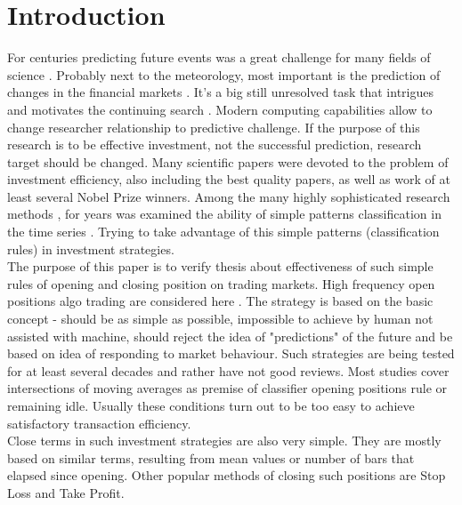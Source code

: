 \documentclass{tewiart}
\begin{document}
\section{Introduction}
\indent For centuries predicting future events was a great challenge for many fields of science \cite{ball07, wu12}. Probably next to the meteorology, most important is the prediction of changes in the financial markets \cite{krutsinger99, satchwell05, schwager02}. It's a big still unresolved task that intrigues and motivates the continuing search \cite{fama91, fama98}. Modern computing capabilities allow to change researcher relationship to predictive challenge. If the purpose of this research is to be effective investment, not the successful prediction, research target should be changed. Many scientific papers were devoted to the problem of investment efficiency, also including the best quality papers, as well as work of at least several Nobel Prize winners. Among the many highly sophisticated research methods \cite{fujimoto03, kompa08, pawlak02, pedrycz97, rua09, raghuraj09, wilinski09}, for years was examined the ability of simple patterns classification in the time series \cite{brock92, cai05, gencay99, lebaron99, satchwell05}. Trying to take advantage of this simple patterns (classification rules) in investment strategies.\\
\indent The purpose of this paper is to verify thesis about effectiveness of such simple rules of opening and closing position on trading markets. High frequency open positions algo trading are considered here \cite{muriel04}. The strategy is based on the basic concept - should be as simple as possible, impossible to achieve by human not assisted with machine, should reject the idea of "predictions" of the future and be based on idea of responding to market behaviour. Such strategies are being tested for at least several decades and rather have not good reviews. Most studies cover intersections of moving averages as premise of classifier opening positions rule or remaining idle. Usually these conditions turn out to be too easy to achieve satisfactory transaction efficiency.\\
\indent Close terms in such investment strategies are also very simple. They are mostly based on similar terms, resulting from mean values or number of bars that elapsed since opening. Other popular methods of closing such positions are Stop Loss and Take Profit.
\end{document}
